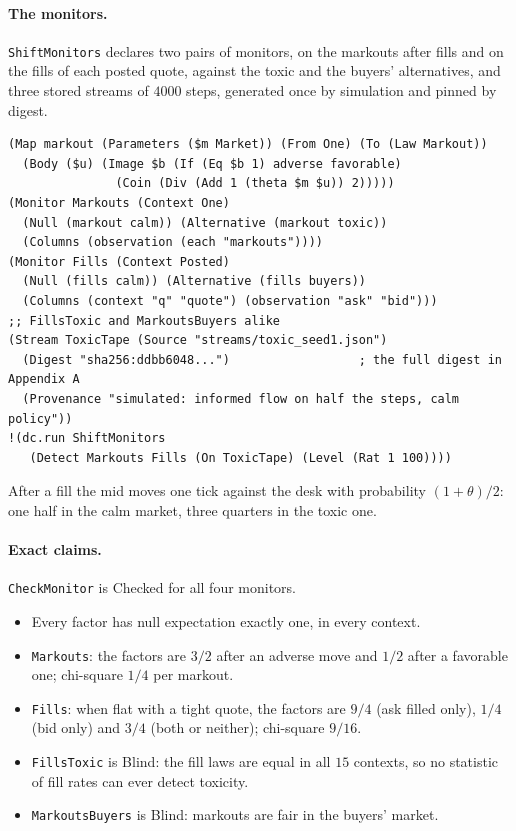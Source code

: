 \documentclass[11pt]{article}
\newcommand{\code}[1]{\texttt{#1}}
\theoremstyle{definition}
\theoremstyle{plain}
\begin{document}
\paragraph{The monitors.} \code{ShiftMonitors} declares two pairs of monitors, on the markouts after fills
and on the fills of each posted quote, against the toxic and the buyers' alternatives, and three stored
streams of $4000$ steps, generated once by simulation and pinned by digest.
\begin{lstlisting}
(Map markout (Parameters ($m Market)) (From One) (To (Law Markout))
  (Body ($u) (Image $b (If (Eq $b 1) adverse favorable)
               (Coin (Div (Add 1 (theta $m $u)) 2)))))
(Monitor Markouts (Context One)
  (Null (markout calm)) (Alternative (markout toxic))
  (Columns (observation (each "markouts"))))
(Monitor Fills (Context Posted)
  (Null (fills calm)) (Alternative (fills buyers))
  (Columns (context "q" "quote") (observation "ask" "bid")))
;; FillsToxic and MarkoutsBuyers alike
(Stream ToxicTape (Source "streams/toxic_seed1.json")
  (Digest "sha256:ddbb6048...")                  ; the full digest in Appendix A
  (Provenance "simulated: informed flow on half the steps, calm policy"))
!(dc.run ShiftMonitors
   (Detect Markouts Fills (On ToxicTape) (Level (Rat 1 100))))
\end{lstlisting}
After a fill the mid moves one tick against the desk with probability $(1+\theta)/2$: one half in the
calm market, three quarters in the toxic one.

\paragraph{Exact claims.} \code{CheckMonitor} is Checked for all four monitors.
\begin{itemize}
\item Every factor has null expectation exactly one, in every context.
\item \code{Markouts}: the factors are $3/2$ after an adverse move and $1/2$ after a favorable one;
chi-square $1/4$ per markout.
\item \code{Fills}: when flat with a tight quote, the factors are $9/4$ (ask filled only), $1/4$ (bid
only) and $3/4$ (both or neither); chi-square $9/16$.
\item \code{FillsToxic} is Blind: the fill laws are equal in all $15$ contexts, so no statistic of fill
rates can ever detect toxicity.
\item \code{MarkoutsBuyers} is Blind: markouts are fair in the buyers' market.
\end{itemize}
\end{document}
